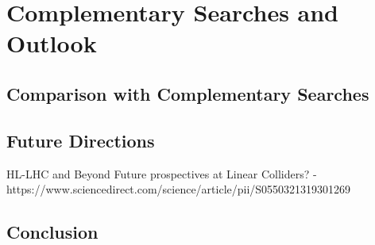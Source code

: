 
\chapter{Complementary Searches and Outlook}
\label{ch:Conclusion}
\section{Comparison with Complementary Searches}
\section{Future Directions}
HL-LHC and Beyond
Future prospectives at Linear Colliders? - https://www.sciencedirect.com/science/article/pii/S0550321319301269
\section{Conclusion}


